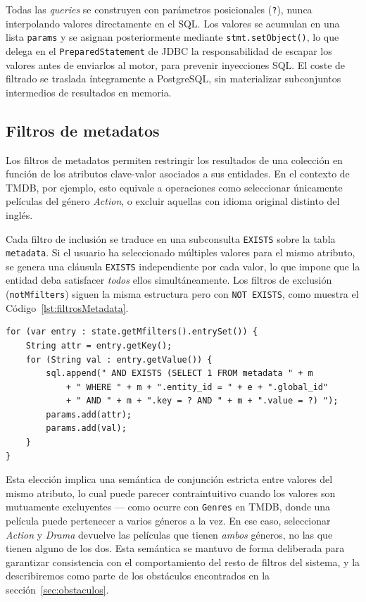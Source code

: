 Todas las \textit{queries} se construyen con parámetros posicionales (\texttt{?}), nunca
interpolando valores directamente en el SQL. Los valores se acumulan en una lista
\texttt{params} y se asignan posteriormente mediante \texttt{stmt.setObject()}, lo que
delega en el \texttt{PreparedStatement} de JDBC la responsabilidad de escapar los valores
antes de enviarlos al motor, para prevenir inyecciones SQL. El coste de filtrado se traslada
íntegramente a PostgreSQL, sin materializar subconjuntos intermedios de resultados en
memoria.

    \subsection{Filtros de metadatos}

Los filtros de metadatos permiten restringir los resultados de una colección en función de los
atributos clave-valor asociados a sus entidades. En el contexto de TMDB, por ejemplo, esto equivale a
operaciones como seleccionar únicamente películas del género \textit{Action}, o excluir
aquellas con idioma original distinto del inglés.

Cada filtro de inclusión se traduce en una subconsulta \texttt{EXISTS} sobre la tabla
\texttt{metadata}. Si el usuario ha seleccionado múltiples valores para el mismo atributo,
se genera una cláusula \texttt{EXISTS} independiente por cada valor, lo que impone que la
entidad deba satisfacer \textit{todos} ellos simultáneamente. Los filtros de exclusión
(\texttt{notMfilters}) siguen la misma estructura pero con \texttt{NOT EXISTS}, como
muestra el Código~\ref{lst:filtrosMetadata}.

\begin{lstlisting}[style=javaStyle, caption=Filtros de metadatos, label=lst:filtrosMetadata]
for (var entry : state.getMfilters().entrySet()) {
    String attr = entry.getKey();
    for (String val : entry.getValue()) {
        sql.append(" AND EXISTS (SELECT 1 FROM metadata " + m
            + " WHERE " + m + ".entity_id = " + e + ".global_id"
            + " AND " + m + ".key = ? AND " + m + ".value = ?) ");
        params.add(attr);
        params.add(val);
    }
}
\end{lstlisting}

Esta elección implica una semántica de conjunción estricta entre valores del mismo atributo,
lo cual puede parecer contraintuitivo cuando los valores son mutuamente excluyentes
--- como ocurre con \texttt{Genres} en TMDB, donde una película puede pertenecer a varios
géneros a la vez. En ese caso, seleccionar \textit{Action} y \textit{Drama} devuelve
las películas que tienen \textit{ambos} géneros, no las que tienen alguno de los dos.
Esta semántica se mantuvo de forma deliberada para garantizar consistencia con el
comportamiento del resto de filtros del sistema, y la describiremos como parte de los
obstáculos encontrados en la sección~\ref{sec:obstaculos}.

